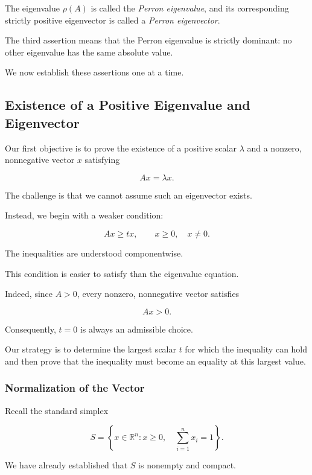 \documentclass[11pt,a4paper]{article}
\theoremstyle{definition}
\theoremstyle{remark}
\begin{document}
The eigenvalue $\rho(A)$ is called
the \emph{Perron eigenvalue},
and its corresponding strictly
positive eigenvector is called
a \emph{Perron eigenvector}.

The third assertion means that
the Perron eigenvalue is strictly
dominant: no other eigenvalue
has the same absolute value.

We now establish these assertions
one at a time.


\subsection{Existence of a Positive Eigenvalue
and Eigenvector}

Our first objective is to prove
the existence of a positive scalar
$\lambda$ and a nonzero,
nonnegative vector $x$ satisfying

\[
Ax=\lambda x.
\]

The challenge is that we cannot
assume such an eigenvector exists.

Instead, we begin with a weaker
condition:

\begin{equation}
Ax\geq tx,
\qquad
x\geq0,\quad x\neq0.
\label{eq:perron_inequality}
\end{equation}

The inequalities are understood
componentwise.

This condition is easier to satisfy
than the eigenvalue equation.

Indeed, since $A>0$, every nonzero,
nonnegative vector satisfies

\[
Ax>0.
\]

Consequently, $t=0$ is always
an admissible choice.

Our strategy is to determine
the largest scalar $t$ for which
the inequality can hold and
then prove that the inequality
must become an equality
at this largest value.


\subsubsection{Normalization of the Vector}

Recall the standard simplex

\begin{equation}
S=
\left\{
x\in\mathbb{R}^n:
x\geq0,\quad
\sum_{i=1}^{n}x_i=1
\right\}.
\label{eq:perron_simplex}
\end{equation}

We have already established that
$S$ is nonempty and compact.
\end{document}
